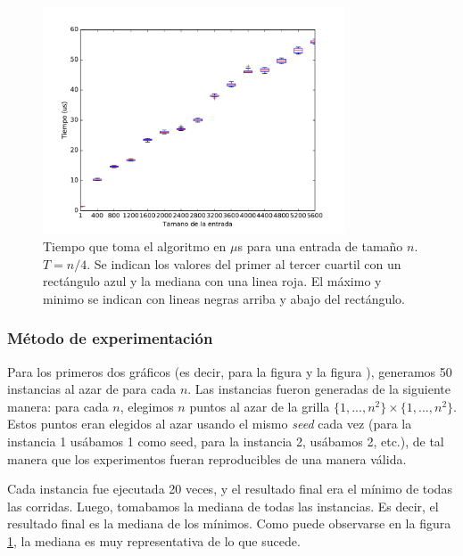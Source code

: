 \begin{figure}[H]
 \centering
	\includegraphics[width=0.8\textwidth]{img/tiempos/genkidama3.pdf}
	\caption{\footnotesize Tiempo que toma el algoritmo en $\mu$s para una entrada de tamaño $n$. $T = n/4$. Se indican los valores del primer al tercer cuartil con un rectángulo azul y la mediana con una linea roja. El máximo y minimo se indican con lineas negras arriba y abajo del rectángulo.}
	\label{fig:genkidama-tiempos3}
\end{figure}

\subsubsection{M\'etodo de experimentación}

Para los primeros dos gráficos (es decir, para la figura \label{fig:genkidama-tiempos1} y la figura \label{fig:genkidama-tiempos2}), generamos 50 instancias al azar de para cada $n$.
Las instancias fueron generadas de la siguiente manera: para cada $n$, elegimos $n$ puntos al azar de la grilla $\{1,..., n^2\} \times \{1, ... , n^2\}$.
Estos puntos eran elegidos al azar usando el mismo \emph{seed} cada vez (para la instancia 1 usábamos 1 como seed, para la instancia 2, usábamos 2, etc.), de tal manera que los experimentos fueran reproducibles de una manera válida.

Cada instancia fue ejecutada 20 veces, y el resultado final era el mínimo de todas las corridas.
Luego, tomabamos la mediana de todas las instancias.
Es decir, el resultado final es la mediana de los mínimos. Como puede observarse en la figura \ref{fig:genkidama-tiempos3}, la mediana es muy representativa de lo que sucede.
